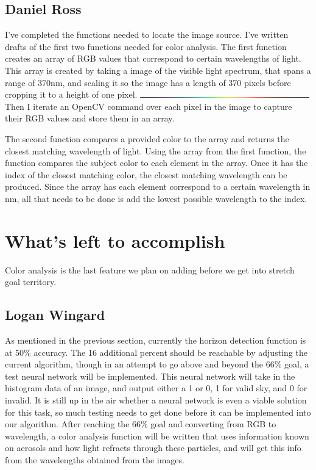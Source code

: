 \documentclass[onecolumn, draftclsnofoot,10pt, compsoc]{IEEEtran}
\begin{document}
\begin{singlespace}
		\subsection{Daniel Ross}
			I've completed the functions needed to locate the image source.
			I've written drafts of the first two functions needed for color analysis.
			The first function creates an array of RGB values that correspond to certain wavelengths of light.
			This array is created by taking a image of the visible light spectrum, that spans a range of 370nm, and scaling it so the image has a length of 370 pixels before cropping it to a height of one pixel.
			\includegraphics[height=0.02cm,natwidth=370,natheight=7]{images/Visible_Color_Spectrum_1_pixel.png}
			Then I iterate an OpenCV command over each pixel in the image to capture their RGB values and store them in an array.
			
			The second function compares a provided color to the array and returns the closest matching wavelength of light.
			Using the array from the first function, the function compares the subject color to each element in the array.
			Once it has the index of the closest matching color, the closest matching wavelength can be produced.
			Since the array has each element correspond to a certain wavelength in nm, all that needs to be done is add the lowest possible wavelength to the index.
			
	\section{What's left to accomplish}
		Color analysis is the last feature we plan on adding before we get into stretch goal territory.
		\subsection{Logan Wingard}
			As mentioned in the previous section, currently the horizon detection function is at 50\% accuracy. 
			The 16 additional percent should be reachable by adjusting the current algorithm, though in an attempt to go above and beyond the 66\% goal, a test neural network will be implemented.
			This neural network will take in the histogram data of an image, and output either a 1 or 0, 1 for valid sky, and 0 for invalid.
			It is still up in the air whether a neural network is even a viable solution for this task, so much testing needs to get done before it can be implemented into our algorithm.
			After reaching the 66\% goal and converting from RGB to wavelength, a color analysis function will be written that uses information known on aerosols and how light refracts through these particles, and will get this info from the wavelengths obtained from the images.


\end{singlespace}
\end{document}
